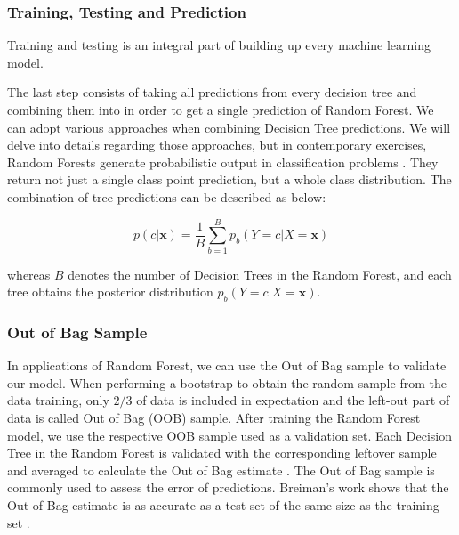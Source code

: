 \subsubsection {Training, Testing and Prediction}
Training and testing is an integral part of building up every machine learning model.


The last step consists of taking all predictions from 
every decision tree and combining them into in order to get a single prediction of Random Forest. 
We can adopt various approaches when combining Decision Tree predictions. 
We will delve into details regarding those approaches, but in contemporary exercises, 
Random Forests generate probabilistic output in classification problems \cite{CGV-035}. 
They return not just a single class point prediction, 
but a whole class distribution. The combination of tree predictions can be described as below:

\begin{equation}
	p(c|\textbf{x}) =  \frac{1}{B} \displaystyle\sum_{b=1}^{B} p_{b}(Y = c |X = \textbf{x})
\end{equation}

whereas $B$ denotes the number of Decision Trees in the Random Forest, and each tree obtains the posterior 
distribution $ p_{b}(Y = c |X = \textbf{x}) $.


\subsubsection {Out of Bag Sample}
In applications of Random Forest, we can use the Out of Bag sample to validate our model.
When performing a bootstrap to obtain the random sample from the data training, 
only $2/3$ of data is included in expectation and the
left-out part of data is called Out of Bag (OOB) sample.
After training the Random Forest model, we use the respective OOB sample used as a validation set. 
Each Decision Tree in the Random Forest is validated with the corresponding leftover sample 
and averaged to calculate the Out of Bag estimate \cite{friedman2001elements}. 
The Out of Bag sample is commonly used to assess the error of predictions. 
Breiman’s work \cite{Breiman1996OUT-OF-BAG-E} shows that the Out of Bag estimate is as accurate 
as a test set of the same size as the training set \cite{Breiman1996OUT-OF-BAG-E}.


